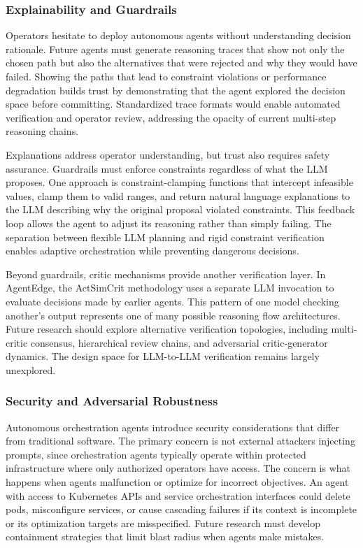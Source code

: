 \subsubsection{Explainability and Guardrails}
\label{subsubsec:ch6_explainability}

Operators hesitate to deploy autonomous agents without understanding decision rationale. Future agents must generate reasoning traces that show not only the chosen path but also the alternatives that were rejected and why they would have failed. Showing the paths that lead to constraint violations or performance degradation builds trust by demonstrating that the agent explored the decision space before committing. Standardized trace formats would enable automated verification and operator review, addressing the opacity of current multi-step reasoning chains.

Explanations address operator understanding, but trust also requires safety assurance. Guardrails must enforce constraints regardless of what the \ac{LLM} proposes. One approach is constraint-clamping functions that intercept infeasible values, clamp them to valid ranges, and return natural language explanations to the \ac{LLM} describing why the original proposal violated constraints. This feedback loop allows the agent to adjust its reasoning rather than simply failing. The separation between flexible \ac{LLM} planning and rigid constraint verification enables adaptive orchestration while preventing dangerous decisions.

Beyond guardrails, critic mechanisms provide another verification layer. In \ac{AgentEdge}, the \ac{ActSimCrit} methodology uses a separate \ac{LLM} invocation to evaluate decisions made by earlier agents. This pattern of one model checking another's output represents one of many possible reasoning flow architectures. Future research should explore alternative verification topologies, including multi-critic consensus, hierarchical review chains, and adversarial critic-generator dynamics. The design space for \ac{LLM}-to-\ac{LLM} verification remains largely unexplored.

\subsubsection{Security and Adversarial Robustness}
\label{subsubsec:ch6_security}

Autonomous orchestration agents introduce security considerations that differ from traditional software. The primary concern is not external attackers injecting prompts, since orchestration agents typically operate within protected infrastructure where only authorized operators have access. The concern is what happens when agents malfunction or optimize for incorrect objectives. An agent with access to Kubernetes \acp{API} and service orchestration interfaces could delete pods, misconfigure services, or cause cascading failures if its context is incomplete or its optimization targets are misspecified. Future research must develop containment strategies that limit blast radius when agents make mistakes.

